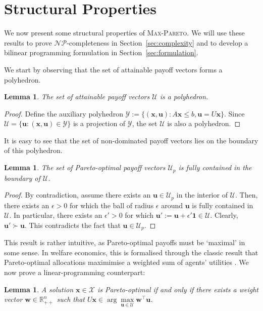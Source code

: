 \documentclass[a4paper, 11pt]{article}
\newtheorem{lem}[thm]{Lemma}
\newcommand{\mc}{\mathcal}
\begin{document}
\section{Structural Properties}
\label{sec:properties}

We now present some structural properties of \textsc{Max-Pareto}. We will use these results to prove $\mc{NP}$-completeness in Section~\ref{sec:complexity} and to develop a bilinear programming formulation in Section~\ref{sec:formulation}.

We start by observing that the set of attainable payoff vectors forms a polyhedron.
\begin{lem}
\label{lem:polyhedron}
The set of attainable payoff vectors $\mc{U}$ is a polyhedron.
\end{lem}
\begin{proof}
Define the auxiliary polyhedron $\mc{Y} := \{ (\bm{x}, \bm{u}) : A \bm{x} \leq b, \bm{u} = U \bm{x} \}$. Since $\mc{U} = \{ \bm{u} : (\bm{x}, \bm{u}) \in \mc{Y}\}$ is a projection of $\mc{Y}$, the set $\mc{U}$ is also a polyhedron.
\end{proof}

It is easy to see that the set of non-dominated payoff vectors lies on the boundary of this polyhedron.
\begin{lem}
The set of Pareto-optimal payoff vectors $\mc{U}_p$ is fully contained in the boundary of $\mc{U}$.
\end{lem}

\begin{proof}
By contradiction, assume there exists an $\bm{u} \in \mc{U}_p$ in the interior of $\mc{U}$. Then, there exists an $\epsilon > 0$ for which the ball of radius $\epsilon$ around $\bm{u}$ is fully contained in $\mc{U}$. In particular, there exists an $\epsilon' > 0$ for which $\bm{u}' := \bm{u} + \epsilon' \bm{1} \in \mc{U}$. Clearly, $\bm{u}' \succ \bm{u}$. This contradicts the fact that $\bm{u} \in \mc{U}_p$. 
\end{proof}

This result is rather intuitive, as Pareto-optimal payoffs must be `maximal' in some sense. In welfare economics, this is formalised through the classic result that Pareto-optimal allocations maximimise a weighted sum of agents' utilities \citep{negishi1960welfare}. We now prove a linear-programming counterpart:
\begin{lem}
\label{lem:support}
A solution $\bm{x} \in \mc{X}$ is Pareto-optimal if and only if there exists a weight vector $\bm{w} \in \mathbb{R}^{n}_{++}$ such that $U \bm{x} \in \arg \max\limits_{\bm{u} \in \mc{U}}  \bm{w}^\top \bm{u}$.
\end{lem}
\end{document}
